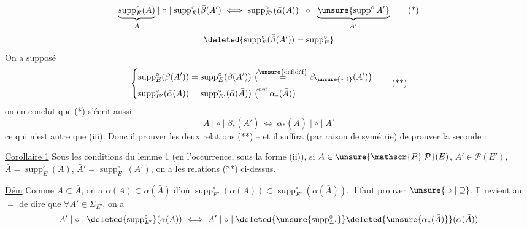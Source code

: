 
\[
\underbrace{\operatorname{supp}^{\circ}_E(A)}_{\bar A}\mid\circ\mid\operatorname{supp}^{\circ}_E(\bar\beta(A')\ \Longleftrightarrow\ \operatorname{supp}^{\circ}_{E'}(\bar\alpha(A))\mid\circ\mid\underbrace{\unsure{\operatorname{supp}^{\circ}A'}}_{\bar A'}
\tag*{(*)}
\]
\[
\deleted{\operatorname{supp}^{\circ}_E(\bar\beta(A'))=\operatorname{supp}^{\circ}_E}
\]
 On a supposé
\[
\left\{
\begin{aligned}
\operatorname{supp}^{\circ}_E(\bar\beta(A'))&=\operatorname{supp}^{\circ}_E(\bar\beta(\bar A'))\ \bigl(\overset{\text{\unsure{def|déf}}}=\beta_{\unsure{*|\ell}}(\bar A')\bigr)\\
\operatorname{supp}^{\circ}_{E'}(\bar\alpha(A))&=\operatorname{supp}^{\circ}_{E'}(\bar\alpha(\bar A))\ \bigl(\overset{\text{def}}=\alpha_*(\bar A)\bigr)
\end{aligned}
\right.
\tag*{(**)}
\]
on en conclut que (*) s'écrit aussi
\[
\bar A\mid\circ\mid\beta_*(\bar A')\ \Longleftrightarrow\ \alpha_*(\bar A)\mid\circ\mid\bar A'
\]
ce qui n'est autre que (iii).
Donc il  prouver  les deux relations (**) -- et il suffira  (par raison de symétrie) de prouver la seconde :

\uline{Corollaire 1} Sous les conditions du lemme 1 (en l'occurrence, sous la forme (ii)), si $A\in\unsure{\mathscr{P}|\mathcal{P}}(E)$, $A'\in\mathscr{P}(E')$, $\bar A=\operatorname{supp}^{\circ}_E(A)$, $\bar A'=\operatorname{supp}^{\circ}_{E'}(A')$, on a les relations (**) ci-dessus.

\uline{Dém} Comme $A\subset\bar A$, on a $\bar\alpha(A)\subset\bar\alpha(\bar A)$ d'où $\operatorname{supp}^{\circ}_{E'}(\bar\alpha(A))\subset\operatorname{supp}^{\circ}_{E'}(\bar\alpha(\bar A))$, il faut prouver $\unsure{\supset|\supseteq}$. Il revient au $=$ de dire que $\forall A'\in\Sigma_{E'}$, on a
\[
A'\mid\circ\mid\deleted{\operatorname{supp}^{\circ}_{E'}}(\bar\alpha(A))\ \Longleftrightarrow\ A'\mid\circ\mid\deleted{\unsure{\operatorname{supp}^{\circ}_{E'}}}\deleted{\unsure{\alpha_*(\bar A)}}(\bar\alpha(\bar A))
\]
